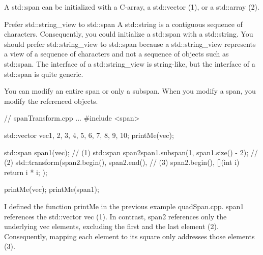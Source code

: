 A std::span can be initialized with a C-array, a std::vector (1), or a std::array (2).



\begin{myTip}{Prefer std::string\_view to std::span}
A std::string is a contiguous sequence of characters. Consequently, you could initialize a std::span with a std::string. You should prefer std::string\_view to std::span because a std::string\_view represents a view of a sequence of characters and not a sequence of objects such as std::span. The interface of a std::string\_view is string-like, but the interface of a std::span is quite generic.
\end{myTip}

You can modify an entire span or only a subspan. When you modify a span, you modify the referenced objects.


\begin{cpp}
// spanTransform.cpp
...
#include <span>

std::vector vec{1, 2, 3, 4, 5, 6, 7, 8, 9, 10};
printMe(vec);

std::span span1(vec); // (1)
std::span span2{span1.subspan(1, span1.size() - 2)}; // (2)
std::transform(span2.begin(), span2.end(), // (3)
				span2.begin(),
				[](int i){ return i * i; });
				
printMe(vec);
printMe(span1);
\end{cpp}

I defined the function printMe in the previous example quadSpan.cpp. span1 references the std::vector vec (1). In contrast, span2 references only the underlying vec elements, excluding the first and the last element (2). Consequently, mapping each element to its square only addresses those elements (3).



